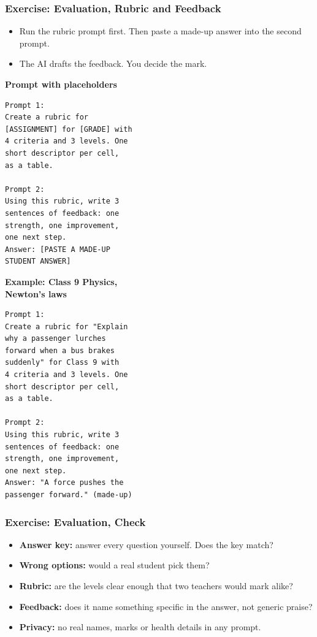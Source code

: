 \begin{frame}[fragile]\frametitle{Exercise: Evaluation, Rubric and Feedback}
\begin{itemize}
\item Run the rubric prompt first. Then paste a made-up answer into the second prompt.
\item The AI drafts the feedback. You decide the mark.
\end{itemize}
\PairBegin
{\footnotesize\textbf{Prompt with placeholders}\\\mbox{}}
\begin{lstlisting}[language={},numbers=none]
Prompt 1:
Create a rubric for
[ASSIGNMENT] for [GRADE] with
4 criteria and 3 levels. One
short descriptor per cell,
as a table.

Prompt 2:
Using this rubric, write 3
sentences of feedback: one
strength, one improvement,
one next step.
Answer: [PASTE A MADE-UP
STUDENT ANSWER]
\end{lstlisting}
\PairMid
{\footnotesize\textbf{Example: Class 9 Physics,\\ Newton's laws}}
\begin{lstlisting}[language={},numbers=none]
Prompt 1:
Create a rubric for "Explain
why a passenger lurches
forward when a bus brakes
suddenly" for Class 9 with
4 criteria and 3 levels. One
short descriptor per cell,
as a table.

Prompt 2:
Using this rubric, write 3
sentences of feedback: one
strength, one improvement,
one next step.
Answer: "A force pushes the
passenger forward." (made-up)
\end{lstlisting}
\PairEnd
\end{frame}

\begin{frame}[fragile]\frametitle{Exercise: Evaluation, Check}
\begin{itemize}
\item \textbf{Answer key:} answer every question yourself. Does the key match?
\item \textbf{Wrong options:} would a real student pick them?
\item \textbf{Rubric:} are the levels clear enough that two teachers would mark alike?
\item \textbf{Feedback:} does it name something specific in the answer, not generic praise?
\item \textbf{Privacy:} no real names, marks or health details in any prompt.
\end{itemize}
\end{frame}

